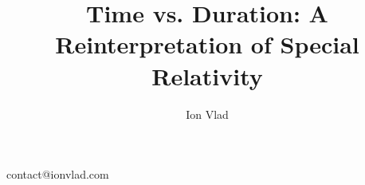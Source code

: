 \documentclass[a4paper,fleqn]{cas-sc}
\begin{document}
\let\WriteBookmarks\relax
\def\floatpagepagefraction{1}
\def\textpagefraction{.001}



\title [mode = title]{Time vs. Duration: A Reinterpretation of Special Relativity}  



%

\author[]{Ion Vlad}%


\fnmark[]

contact@ionvlad.com






\end{document}

